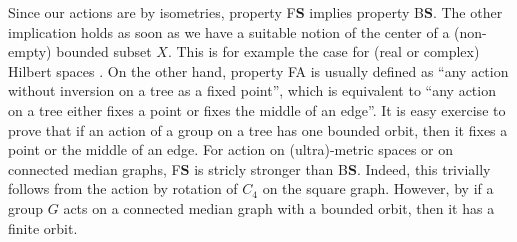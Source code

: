 \documentclass[a4paper]{article}
\theoremstyle{definition}
\newcommand*{\BS}{B$\mathbf{S}$}
\begin{document}
Since our actions are by isometries, property F$\mathbf S$ implies property \BS. The other implication holds as soon as we have a suitable notion of the center of a (non-empty) bounded subset $X$.
This is for example the case for (real or complex) Hilbert spaces \cite[Lemma 2.2.7]{Bekka2008}. On the other hand, property FA is usually defined as ``any action without inversion on a tree as a fixed point'', which is equivalent to ``any action on a tree either fixes a point or fixes the middle of an edge''. It is easy exercise to prove that if an action of a group on a tree has one bounded orbit, then it fixes a point or the middle of an edge.
For action on (ultra)-metric spaces or on connected median graphs, F$\mathbf S$ is stricly stronger than \BS. Indeed, this trivially follows from the action by rotation of $C_4$ on the square graph.
However,  by \cite{MR1663779, Cornulier2013} if a group $G$ acts on a connected median graph with a bounded orbit, then it has a finite orbit.
\end{document}
